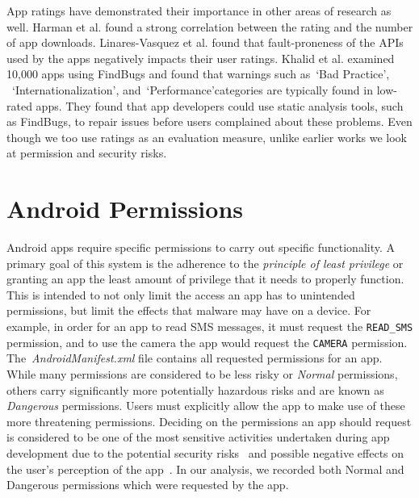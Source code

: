 \documentclass{sig-alternate-05-2015}
\newcommand{\todo}[1]{\textcolor{cyan}{\textbf{[#1]}}}
\begin{document}
App ratings have demonstrated their importance in other areas of research as well. Harman et al.\cite{6224306} found a strong correlation between the rating and the number of app downloads. Linares-Vasquez et al.\cite{Linares-Vasquez:2013:ACF:2491411.2491428} found that fault-proneness of the APIs used by the apps negatively impacts their user ratings. Khalid et al.\cite{Khalid_Mei_Examinging} examined 10,000 apps using FindBugs and found that warnings such as~\lq Bad Practice\rq, ~\lq Internationalization\rq, and~\lq Performance\rq  categories are typically found in low-rated apps. They found that app developers could use static analysis tools, such as FindBugs, to repair issues before users complained about these problems. Even though we too use ratings as an evaluation measure, unlike earlier works we look at permission and security risks. %





\section{Android Permissions}
\label{sec: androidapps}

Android apps require specific permissions to carry out specific functionality. A primary goal of this system is the adherence to the \emph{principle of least privilege} or granting an app the least amount of privilege that it needs to properly function. This is intended to not only limit the access an app has to unintended permissions, but limit the effects that malware may have on a device. For example, in order for an app to read SMS messages, it must request the \texttt{READ\_SMS} permission, and to use the camera the app would request the \texttt{CAMERA} permission. The~\emph{AndroidManifest.xml} file contains all requested permissions for an app. While many permissions are considered to be less risky or \emph{Normal} permissions, others carry significantly more potentially hazardous risks and are known as \emph{Dangerous} permissions. Users must explicitly allow the app to make use of these more threatening permissions. Deciding on the permissions an app should request is considered to be one of the most sensitive activities undertaken during app development due to the potential security risks~\cite{Felt:2011:APD:2046707.2046779, 5482589} and possible negative effects on the user's perception of the app~\cite{Egelman12choicearchitecture}. In our analysis, we recorded both Normal and Dangerous permissions which were requested by the app.
\end{document}

